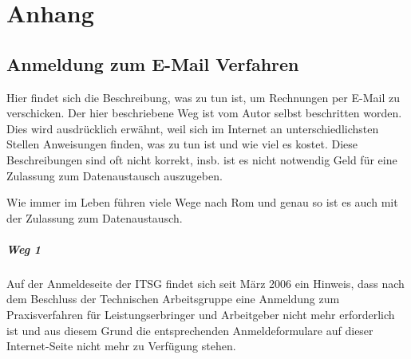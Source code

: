 






\appendix
\chapter{Anhang}

\section{Anmeldung zum E-Mail Verfahren\label{anhang:elekrech}}
Hier findet sich die Beschreibung, was zu tun ist, um Rechnungen per
E-Mail zu verschicken. Der hier beschriebene Weg ist vom Autor selbst
beschritten worden. Dies wird ausdrücklich erwähnt, weil sich im Internet
an unterschiedlichsten Stellen Anweisungen finden, was zu tun ist und
wie viel es kostet. Diese Beschreibungen sind oft nicht korrekt, insb.
ist es nicht notwendig Geld für eine Zulassung zum Datenaustausch
auszugeben.

Wie immer im Leben führen viele Wege nach Rom und genau so ist es auch
mit der Zulassung zum Datenaustausch. 

\paragraph{Weg 1}
Auf der Anmeldeseite der ITSG \cite{itsg_email_anmeldung} findet sich
seit März 2006 ein Hinweis, dass nach dem Beschluss der Technischen
Arbeitsgruppe eine Anmeldung zum Praxisverfahren für Leistungserbringer
und Arbeitgeber nicht mehr erforderlich ist und aus diesem Grund die
entsprechenden Anmeldeformulare auf dieser Internet-Seite nicht mehr zu
Verfügung stehen.

